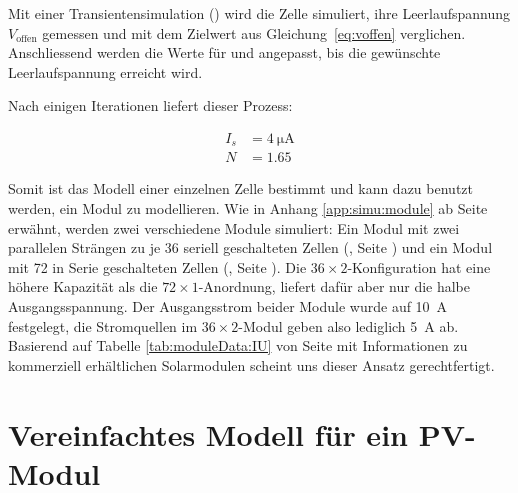 Mit einer  Transientensimulation () wird die  Zelle simuliert,
ihre  Leerlaufspannung  $V_{\mathrm{offen}}$  gemessen und  mit  dem  Zielwert
aus   Gleichung~\ref{eq:voffen}  verglichen.  Anschliessend  werden die  Werte f\"ur   und 
angepasst, bis die gew\"unschte Leerlaufspannung erreicht wird.

Nach einigen Iterationen liefert dieser Prozess\footnotemark:


\begin{align}
    \label{eq:cell:diode:IS:N:result}
    I_s &= \SI{4}{\micro\ampere} \\
    N   &= 1.65
\end{align}

Somit ist  das Modell  einer einzelnen  Zelle bestimmt  und kann  dazu benutzt
werden,  ein   Modul  zu  modellieren. Wie  in   Anhang  \ref{app:simu:module}
ab  Seite   \pageref{app:simu:module}  erw\"ahnt,  werden   zwei  verschiedene
Module   simuliert: Ein   Modul  mit   zwei   parallelen   Str\"angen  zu   je
36  seriell   geschalteten  Zellen  (,
Seite  \pageref{fig:ltspice:module:cellBased:36x2})  und   ein  Modul  mit  72
in   Serie   geschalteten  Zellen   (,
Seite     \pageref{fig:ltspice:module:cellBased:72x1}). Die     $36     \times
2$-Konfiguration   hat   eine  h\"ohere   Kapazit\"at   als
die   $72  \times   1$-Anordnung,   liefert  daf\"ur   aber   nur  die   halbe
Ausgangsspannung. Der Ausgangsstrom  beider Module wurde  auf \SI{10}{\ampere}
festgelegt,  die Stromquellen  im  $36 \times  2$-Modul  geben also  lediglich
\SI{5}{\ampere}  ab. Basierend auf  Tabelle \ref{tab:moduleData:IU}  von Seite
\pageref{tab:moduleData:IU}  mit Informationen  zu kommerziell  erh\"altlichen
Solarmodulen scheint uns dieser Ansatz gerechtfertigt.


\section{Vereinfachtes Modell f\"ur ein PV-Modul}
\label{app:models:develop:module:simple}

